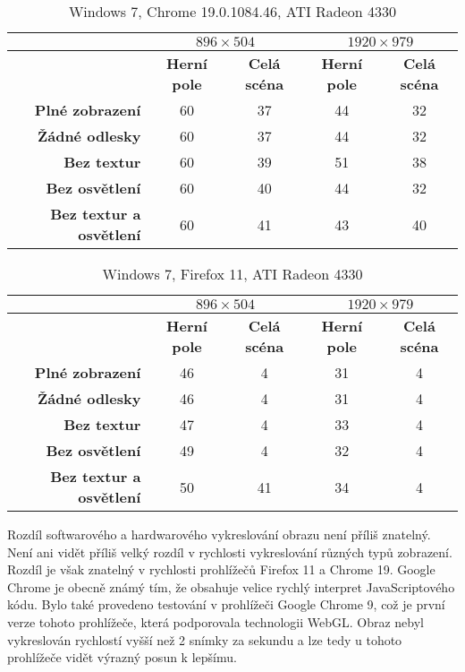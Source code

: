 
\begin{table}[!ht]
\begin{center}
\begin{tabular}{ | r | c | c | c | c |}
\hline
 & \multicolumn{2}{|c|}{$896 \times 504$} & \multicolumn{2}{|c|}{$1920 \times 979$} \\ \hline
 & \textbf{Herní pole} & \textbf{Celá scéna} & \textbf{Herní pole} & \textbf{Celá scéna} \\ \hline
\textbf{Plné zobrazení} & 60 & 37 & 44 & 32 \\ \hline
\textbf{Žádné odlesky} & 60 & 37 & 44 & 32 \\ \hline
\textbf{Bez textur} & 60 & 39 & 51 & 38 \\ \hline
\textbf{Bez osvětlení} & 60 & 40 & 44 & 32 \\ \hline
\textbf{Bez textur a osvětlení} & 60 & 41 & 43 & 40 \\ \hline
\end{tabular}
\end{center}
\caption{Windows 7, Chrome 19.0.1084.46, ATI Radeon 4330}
\end{table}

\begin{table}[!ht]
\begin{center}
\begin{tabular}{ | r | c | c | c | c |}
\hline
 & \multicolumn{2}{|c|}{$896 \times 504$} & \multicolumn{2}{|c|}{$1920 \times 979$} \\ \hline
 & \textbf{Herní pole} & \textbf{Celá scéna} & \textbf{Herní pole} & \textbf{Celá scéna} \\ \hline
\textbf{Plné zobrazení} & 46 & 4 & 31 & 4 \\ \hline
\textbf{Žádné odlesky} & 46 & 4 & 31 & 4 \\ \hline
\textbf{Bez textur} & 47 & 4 & 33 & 4 \\ \hline
\textbf{Bez osvětlení} & 49 & 4 & 32 & 4 \\ \hline
\textbf{Bez textur a osvětlení} & 50 & 41 & 34 & 4 \\ \hline
\end{tabular}
\end{center}
\caption{Windows 7, Firefox 11, ATI Radeon 4330}
\end{table}

Rozdíl softwarového a hardwarového vykreslování obrazu není příliš znatelný. Není ani vidět příliš velký rozdíl v rychlosti vykreslování různých typů zobrazení. Rozdíl je však znatelný v rychlosti prohlížečů Firefox 11 a Chrome 19. Google Chrome je obecně známý tím, že obsahuje velice rychlý interpret JavaScriptového kódu. Bylo také provedeno testování v prohlížeči Google Chrome 9, což je první verze tohoto prohlížeče, která podporovala technologii WebGL. Obraz nebyl vykreslován rychlostí vyšší než 2 snímky za sekundu a lze tedy u tohoto prohlížeče vidět výrazný posun k lepšímu.

